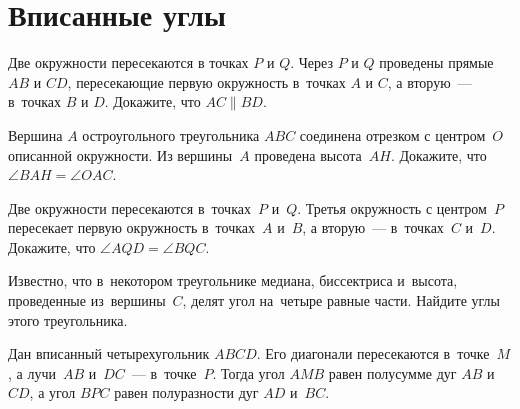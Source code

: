 
\section*{Вписанные углы}



\begin{problems}

\item
Две окружности пересекаются в точках $P$ и $Q$.
Через $P$ и $Q$ проведены прямые $AB$ и $CD$, пересекающие первую окружность
в~точках $A$ и $C$, а вторую~--- в~точках $B$ и $D$.
Докажите, что $AC \parallel BD$.

\item
Вершина $A$ остроугольного треугольника $ABC$ соединена отрезком с центром~$O$
описанной окружности.
Из вершины~$A$ проведена высота~$AH$.
Докажите, что~$\angle BAH = \angle OAC$.

\item
Две окружности пересекаются в~точках~$P$ и~$Q$.
Третья окружность с центром~$P$ пересекает первую окружность в~точках~$A$
и~$B$, а вторую~--- в~точках~$C$ и~$D$.
Докажите, что $\angle AQD = \angle BQC$.

\item
Известно, что в~некотором треугольнике медиана, биссектриса и~высота,
проведенные из~вершины~$C$, делят угол на~четыре равные части.
Найдите углы этого треугольника.

\end{problems}

\statement
Дан вписанный четырехугольник $ABCD$.
Его диагонали пересекаются в~точке~$M$, а лучи~$AB$ и~$DC$~--- в~точке~$P$.
Тогда угол $AMB$ равен полусумме дуг $AB$ и~$CD$,
а угол $BPC$ равен полуразности дуг $AD$ и~$BC$.

